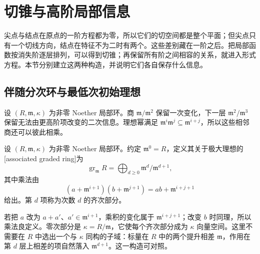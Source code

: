 
% 
% 
% 

\section{切锥与高阶局部信息}
\label{g5:sec:0504}

尖点与结点在原点的一阶方程都为零，所以它们的切空间都是整个平面；但尖点只有一个切线方向，结点在特征不为二时有两个。这些差别藏在一阶之后。把局部函数按消失阶逐层排列，可以得到切锥；再保留所有阶之间相容的关系，就进入形式方程。本节分别建立这两种构造，并说明它们各自保存什么信息。

\subsection{伴随分次环与最低次初始理想}
\label{g5:subsec:0504:01}

设 \((R,\mathfrak m,\kappa)\) 为非零 Noether 局部环。商 \(\mathfrak m/\mathfrak m^2\) 保留一次变化，下一层 \(\mathfrak m^2/\mathfrak m^3\) 保留无法由更高阶项改变的二次信息。理想幂满足 \(\mathfrak m^i\mathfrak m^j\subseteq\mathfrak m^{i+j}\)，所以这些相邻商还可以彼此相乘。

\begin{definition}
\label{g5:def:associated-graded}
	设 \((R,\mathfrak m,\kappa)\) 为非零 Noether 局部环。约定 \(\mathfrak m^0=R\)，定义其关于极大理想的[associated graded ring]为
	\[
		\operatorname{gr}_{\mathfrak m}R
		=\bigoplus_{d\geq0}\mathfrak m^d/\mathfrak m^{d+1},
	\]
	其中乘法由
	\[
		(a+\mathfrak m^{i+1})(b+\mathfrak m^{j+1})
		=ab+\mathfrak m^{i+j+1}
	\]
	给出。第 \(d\) 项称为次数 \(d\) 的齐次部分。
\end{definition}

若把 \(a\) 改为 \(a+a'\)、\(a'\in\mathfrak m^{i+1}\)，乘积的变化属于 \(\mathfrak m^{i+j+1}\)；改变 \(b\) 时同理，所以乘法良定义。零次部分是 \(\kappa=R/\mathfrak m\)，它使每个齐次部分成为 \(\kappa\) 向量空间。这里不需要在 \(R\) 中选出一个与 \(\kappa\) 同构的子域：标量在 \(R\) 中的两个提升相差 \(\mathfrak m\)，作用在第 \(d\) 层上相差的项自然落入 \(\mathfrak m^{d+1}\)。这一构造可对照\cite[第13节，第93页]{Matsumura1989}。

